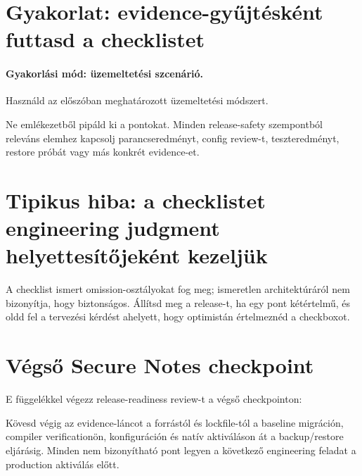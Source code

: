 \section{Gyakorlat: evidence-gyűjtésként futtasd a checklistet}
\paragraph{Gyakorlási mód: üzemeltetési szcenárió.} Használd az előszóban meghatározott üzemeltetési módszert.

Ne emlékezetből pipáld ki a pontokat. Minden release-safety szempontból releváns elemhez kapcsolj parancseredményt, config review-t, teszteredményt, restore próbát vagy más konkrét evidence-et.

\section{Tipikus hiba: a checklistet engineering judgment helyettesítőjeként kezeljük}
A checklist ismert omission-osztályokat fog meg; ismeretlen architektúráról nem bizonyítja, hogy biztonságos. Állítsd meg a release-t, ha egy pont kétértelmű, és oldd fel a tervezési kérdést ahelyett, hogy optimistán értelmeznéd a checkboxot.

\section{Végső Secure Notes checkpoint}
E függelékkel végezz release-readiness review-t a végső checkpointon:
\begin{quote}\end{quote} Kövesd végig az evidence-láncot a forrástól és lockfile-tól a baseline migráción, compiler verificationön, konfiguráción és natív aktiváláson át a backup/restore eljárásig. Minden nem bizonyítható pont legyen a következő engineering feladat a production aktiválás előtt.
